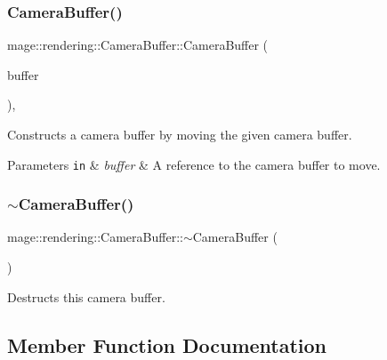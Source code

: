 \subsubsection{\texorpdfstring{Camera\+Buffer()}{CameraBuffer()}\hspace{0.1cm}{\footnotesize\ttfamily [3/3]}}
{\footnotesize\ttfamily mage\+::rendering\+::\+Camera\+Buffer\+::\+Camera\+Buffer (\begin{DoxyParamCaption}\item[{\mbox{\hyperlink{structmage_1_1rendering_1_1_camera_buffer}{Camera\+Buffer}} \&\&}]{buffer }\end{DoxyParamCaption})\hspace{0.3cm}{\ttfamily [default]}, {\ttfamily [noexcept]}}

Constructs a camera buffer by moving the given camera buffer.


\begin{DoxyParams}[1]{Parameters}
\mbox{\tt in}  & {\em buffer} & A reference to the camera buffer to move. \\
\hline
\end{DoxyParams}
\mbox{\label{structmage_1_1rendering_1_1_camera_buffer_aadd09f0ddad88a8463e8dda3ae4e3849}} 
\subsubsection{\texorpdfstring{$\sim$\+Camera\+Buffer()}{~CameraBuffer()}}
{\footnotesize\ttfamily mage\+::rendering\+::\+Camera\+Buffer\+::$\sim$\+Camera\+Buffer (\begin{DoxyParamCaption}{ }\end{DoxyParamCaption})\hspace{0.3cm}{\ttfamily [default]}}

Destructs this camera buffer. 

\subsection{Member Function Documentation}
\mbox{\label{structmage_1_1rendering_1_1_camera_buffer_a5c0b3a1e054ebcb4597f313c0346da57}} 

